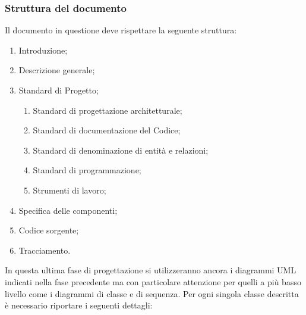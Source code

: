 	\subsubsection{Struttura del documento}
	Il documento in questione deve rispettare la seguente struttura:
	\begin{enumerate}
	\item Introduzione;
	\item Descrizione generale;
	\item Standard di Progetto;
	\begin{enumerate}
	\item Standard di progettazione architetturale;
	\item Standard di documentazione del Codice;
	\item Standard di denominazione di entità e relazioni;
	\item Standard di programmazione;
	\item Strumenti di lavoro;
	\end{enumerate}
	\item Specifica delle componenti;
	\item Codice sorgente;
	\item Tracciamento.
	\end{enumerate}
	In questa ultima fase di progettazione si utilizzeranno ancora i diagrammi UML indicati nella fase precedente ma con particolare attenzione per quelli a più basso livello come i diagrammi di classe e di sequenza.
	Per ogni singola classe descritta è necessario riportare i seguenti dettagli:
